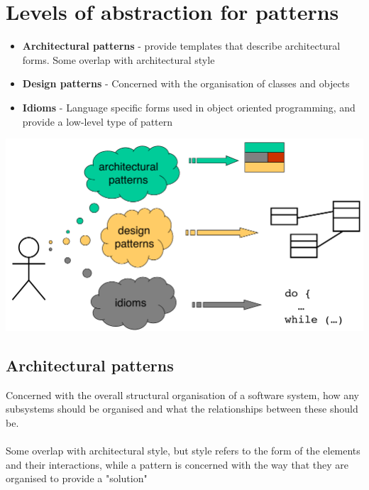 \documentclass{article}[18pt]
\begin{document}
\section{Levels of abstraction for patterns}
\begin{itemize}
	\item \textbf{Architectural patterns} - provide templates that describe architectural forms. Some overlap with architectural style
	\item \textbf{Design patterns} - Concerned with the organisation of classes and objects
	\item \textbf{Idioms} - Language specific forms used in object oriented programming, and provide a low-level type of pattern
\end{itemize}
\begin{center}
	\includegraphics[scale=0.6]{"Levels of abstraction"}
\end{center}
\subsection{Architectural patterns}
Concerned with the overall structural organisation of a software system, how any subsystems should be organised and what the relationships between these should be.\\
\\
Some overlap with architectural style, but style refers to the form of the elements and their interactions, while a pattern is concerned with the way that they are organised to provide a "solution"
\end{document}
